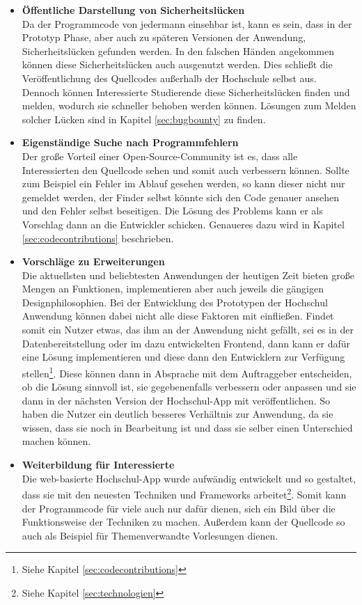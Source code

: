 \begin{itemize}
\item \textbf{Öffentliche Darstellung von Sicherheitslücken}\\
Da der Programmcode von jedermann einsehbar ist, kann es sein, dass in der Prototyp Phase, aber auch zu späteren Versionen der Anwendung, Sicherheitslücken gefunden werden. In den falschen Händen angekommen können diese Sicherheitslücken auch ausgenutzt werden. Dies schließt die Veröffentlichung des Quellcodes außerhalb der Hochschule selbst aus. Dennoch können Interessierte Studierende diese Sicherheitslücken finden und melden, wodurch sie schneller behoben werden können. Lösungen zum Melden solcher Lücken sind in Kapitel \ref{sec:bugbounty} zu finden.

\item \textbf{Eigenständige Suche nach Programmfehlern}\\
Der große Vorteil einer Open-Source-Community ist es, dass alle Interessierten den Quellcode sehen und somit auch verbessern können. Sollte zum Beispiel ein Fehler im Ablauf gesehen werden, so kann dieser nicht nur gemeldet werden, der Finder selbst könnte sich den Code genauer ansehen und den Fehler selbst beseitigen. Die Lösung des Problems kann er als Vorschlag dann an die Entwickler schicken. Genaueres dazu wird in Kapitel \ref{sec:codecontributions} beschrieben.

\item \textbf{Vorschläge zu Erweiterungen}\\
Die aktuellsten und beliebtesten Anwendungen der heutigen Zeit bieten große Mengen an Funktionen, implementieren aber auch jeweils die gängigen Designphilosophien. Bei der Entwicklung des Prototypen der Hochschul Anwendung können dabei nicht alle diese Faktoren mit einfließen. Findet somit ein Nutzer etwas, das ihm an der Anwendung nicht gefällt, sei es in der Datenbereitstellung oder im dazu entwickelten Frontend, dann kann er dafür eine Lösung implementieren und diese dann den Entwicklern zur Verfügung stellen\footnote{Siehe Kapitel \ref{sec:codecontributions}}. Diese können dann in Absprache mit dem Auftraggeber entscheiden, ob die Lösung sinnvoll ist, sie gegebenenfalls verbessern oder anpassen und sie dann in der nächsten Version der Hochschul-\ac{App} mit veröffentlichen. So haben die Nutzer ein deutlich besseres Verhältnis zur Anwendung, da sie wissen, dass sie noch in Bearbeitung ist und dass sie selber einen Unterschied machen können.
\newpage
\item \textbf{Weiterbildung für Interessierte}\\
Die web-basierte Hochschul-\ac{App} wurde aufwändig entwickelt und so gestaltet, dass sie mit den neuesten Techniken und Frameworks arbeitet\footnote{Siehe Kapitel \ref{sec:technologien}}. Somit kann der Programmcode für viele auch nur dafür dienen, sich ein Bild über die Funktionsweise der Techniken zu machen. Außerdem kann der Quellcode so auch als Beispiel für Themenverwandte Vorlesungen dienen.
\end{itemize}

